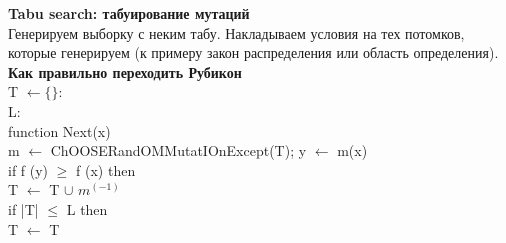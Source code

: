 \textbf{Tabu search: табуирование мутаций} \\ 
Генерируем выборку с неким табу. Накладываем условия на тех потомков, которые генерируем (к примеру закон распределения или область определения). \\
\textbf{Как правильно переходить Рубикон} \\
T $\leftarrow \lbrace \rbrace$:  \\
L:  \\
function Next(x)  \\
\tab m $\leftarrow$ ChOOSERandOMMutatIOnExcept(T); y $\leftarrow$ m(x)  \\
\tab if f (y) $\ge$ f (x) then  \\
\tab \tab T $\leftarrow$ T $\cup$ { $m^{(-1)}$} \\ 
\tab \tab if |T| $\le$ L then \\ 
\tab \tab \tab T $\leftarrow$ T   \\
\tab \tab {}  \\
\tab \tab {}  \\
\tab {}  \\
\tab {}  \\
  \\
